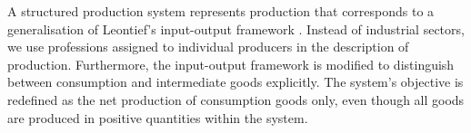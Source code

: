 \documentclass[11pt,fleqn]{article}
\newtheorem{definition}[theorem]{Definition}
\newtheorem{expl}[theorem]{Example}
\newenvironment{example}{\begin{expl} \rm}{\hfill $\blacklozenge$
\end{expl}}
\begin{document}
A structured production system represents production that corresponds to a generalisation of Leontief's input-output framework \citep{Leontief1936,Leontief1941}. Instead of industrial sectors, we use professions assigned to individual producers in the description of production. Furthermore, the input-output framework is modified to distinguish between consumption and intermediate goods explicitly. The system's objective is redefined as the net production of consumption goods only, even though all goods are produced in positive quantities within the system.
%
%
%
%
%
\end{document}
